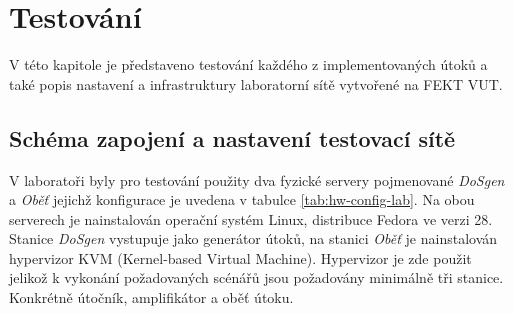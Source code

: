 \chapter{Testování}
\label{chap:testovani}
V této kapitole je představeno testování každého z implementovaných útoků a také popis nastavení a infrastruktury laboratorní sítě vytvořené na FEKT VUT.

\section{Schéma zapojení a nastavení testovací sítě}
V laboratoři byly pro testování použity dva fyzické servery pojmenované \textit{DoSgen} a \textit{Oběť} jejichž konfigurace je uvedena v tabulce \ref{tab:hw-config-lab}. Na obou serverech je nainstalován operační systém Linux, distribuce Fedora ve verzi 28. Stanice \textit{DoSgen} vystupuje jako generátor útoků, na stanici \textit{Oběť} je nainstalován hypervizor KVM (Kernel-based Virtual Machine). Hypervizor je zde použit jelikož k vykonání požadovaných scénářů jsou požadovány minimálně tři stanice. Konkrétně útočník, amplifikátor a oběť útoku.

